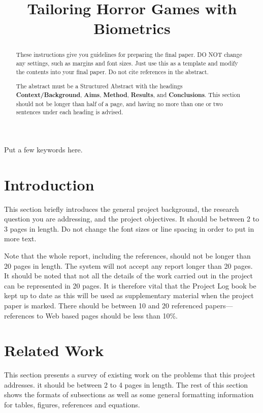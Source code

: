 \documentclass[12pt,a4paper]{article}\usepackage[]{graphicx}\usepackage[]{color}
\title{Tailoring Horror Games with Biometrics}
\author{} %
\date{}
\begin{document}
\maketitle

\begin{abstract}
These instructions give you guidelines for preparing the final paper.  DO NOT change any settings, such as margins and font sizes.  Just use this as a template and modify the contents into your final paper.  Do not cite references in the abstract.

The abstract must be a Structured Abstract with the headings {\bf Context/Background}, {\bf Aims}, {\bf Method}, {\bf Results}, and {\bf Conclusions}.  This section should not be longer than half of a page, and having no more than one or two sentences under each heading is advised.
\end{abstract}

\begin{keywords}
Put a few keywords here.
\end{keywords}

\section{Introduction}
This section briefly introduces the general project background, the research question you are addressing, and the project objectives.  It should be between 2 to 3 pages in length.  Do not change the font sizes or line spacing in order to put in more text.

Note that the whole report, including the references, should not be longer than 20 pages in length.  The system will not accept any report longer than 20 pages.  It should be noted that not all the details of the work carried out in the project can be represented in 20 pages.  It is therefore vital that the Project Log book be kept up to date as this will be used as supplementary material when the project paper is marked.  There should be between 10 and 20 referenced papers---references to Web based pages should be less than 10\%.

\section{Related Work}
This section presents a survey of existing work on the problems that this project addresses.  it should be between 2 to 4 pages in length.  The rest of this section shows the formats of subsections as well as some general formatting information for tables, figures, references and equations.
\end{document}
